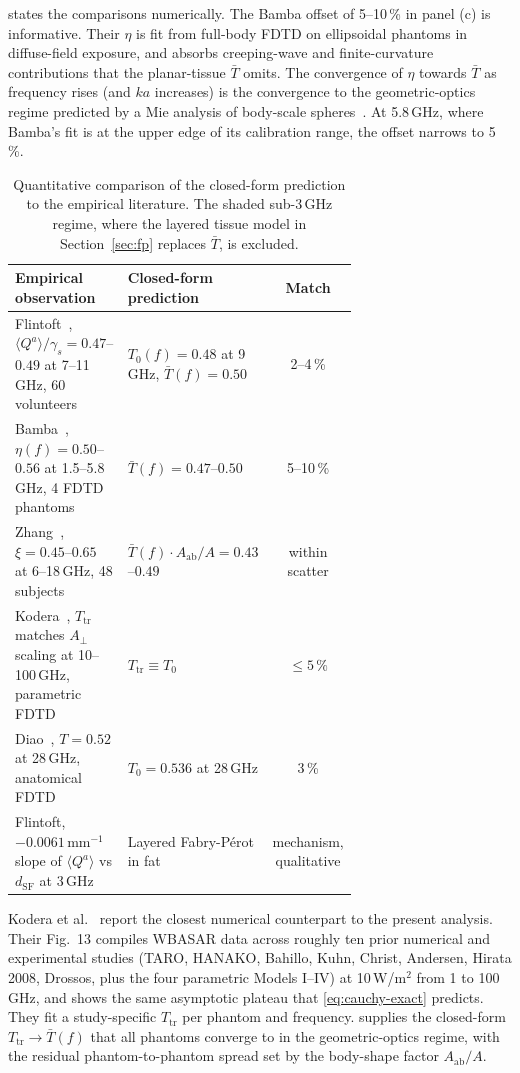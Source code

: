 \documentclass[journal,twocolumn,10pt]{IEEEtran}
\theoremstyle{plain}
\theoremstyle{remark}
\newcommand{\Aab}{A_{\mathrm{ab}}}
\newcommand{\Tbar}{\bar{T}}
\begin{document}
 states the comparisons numerically. The Bamba
offset of 5--10\,\% in panel (c) is informative. Their $\eta$ is fit
from full-body FDTD on ellipsoidal phantoms in diffuse-field
exposure, and absorbs creeping-wave and finite-curvature
contributions that the planar-tissue $\Tbar$ omits. The convergence
of $\eta$ towards $\Tbar$ as frequency rises (and $ka$ increases)
is the convergence to the geometric-optics regime predicted by a Mie
analysis of body-scale spheres~\cite{BohrenHuffman1983}. At
5.8\,GHz, where Bamba's fit is at the upper edge of its calibration
range, the offset narrows to 5\,\%.

\begin{table}[!t]
\centering
\caption{Quantitative comparison of the closed-form prediction to the
empirical literature. The shaded sub-3\,GHz regime, where the layered
tissue model in Section~\ref{sec:fp} replaces $\Tbar$, is excluded.}
\label{tab:waterfall}
\begin{tabular}{p{0.34\linewidth}p{0.34\linewidth}c}
\toprule
Empirical observation & Closed-form prediction & Match \\
\midrule
Flintoft~\cite{Flintoft2014}, $\langle Q^a\rangle/\gamma_s = 0.47$--$0.49$ at 7--11\,GHz, 60 volunteers
& $T_0(f) = 0.48$ at 9\,GHz, $\Tbar(f) = 0.50$
& 2--4\,\% \\
Bamba~\cite{Bamba2014}, $\eta(f) = 0.50$--$0.56$ at 1.5--5.8\,GHz, 4 FDTD phantoms
& $\Tbar(f) = 0.47$--$0.50$
& 5--10\,\% \\
Zhang~\cite{Zhang2017thesis}, $\xi = 0.45$--$0.65$ at 6--18\,GHz, 48 subjects
& $\Tbar(f)\cdot\Aab/A = 0.43$--$0.49$
& within scatter \\
Kodera~\cite{Kodera2024}, $T_{\mathrm{tr}}$ matches $A_\perp$ scaling at 10--100\,GHz, parametric FDTD
& $T_{\mathrm{tr}} \equiv T_0$
& $\leq 5\,\%$ \\
Diao~\cite{Diao2024}, $T = 0.52$ at 28\,GHz, anatomical FDTD
& $T_0 = 0.536$ at 28\,GHz
& 3\,\% \\
Flintoft, $-0.0061\,\mathrm{mm}^{-1}$ slope of $\langle Q^a\rangle$ vs $d_{\mathrm{SF}}$ at 3\,GHz
& Layered Fabry-P\'erot in fat
& mechanism, qualitative \\
\bottomrule
\end{tabular}
\end{table}

Kodera et al.~\cite{Kodera2024} report the closest numerical
counterpart to the present analysis. Their Fig.~13 compiles WBASAR
data across roughly ten prior numerical and experimental studies
(TARO, HANAKO, Bahillo, Kuhn, Christ, Andersen, Hirata 2008,
Drossos, plus the four parametric Models I--IV) at 10\,W/m$^2$ from 1
to 100\,GHz, and shows the same asymptotic plateau that
\eqref{eq:cauchy-exact} predicts. They fit a study-specific
$T_{\mathrm{tr}}$ per phantom and frequency.
 supplies the closed-form $T_{\mathrm{tr}} \to
\Tbar(f)$ that all phantoms converge to in the geometric-optics
regime, with the residual phantom-to-phantom spread set by the
body-shape factor $\Aab/A$.
\end{document}
